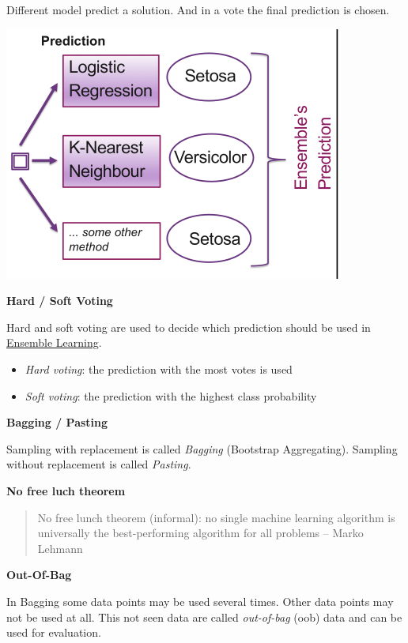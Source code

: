 \documentclass[11pt,landscape]{article}
\begin{document}
\begin{multicols}{3}
Different model predict a solution.
And in a vote the final prediction is chosen.

\begin{center}
\includegraphics[width=.9\linewidth]{img/ensemble_learning_example.png}
\end{center}


\textbf{Hard / Soft Voting}

Hard and soft voting are used to decide which prediction should be used in \href{../../../roam/20211228090232-ensemble_learning.org}{Ensemble Learning}.
\begin{itemize}
\item \emph{Hard voting}: the prediction with the most votes is used
\item \emph{Soft voting}: the prediction with the highest class probability
\end{itemize}


\textbf{Bagging / Pasting}

Sampling with replacement is called \emph{Bagging} (Bootstrap Aggregating).
Sampling without replacement is called \emph{Pasting}.


\textbf{No free luch theorem}

\begin{quote}
No free lunch theorem (informal): no single machine learning algorithm is universally the best-performing algorithm for all problems
-- Marko Lehmann
\end{quote}


\textbf{Out-Of-Bag}

In Bagging some data points may be used several times.
Other data points may not be used at all.
This not seen data are called \emph{out-of-bag} (oob) data and can be used for evaluation.

\end{multicols}
\end{document}
